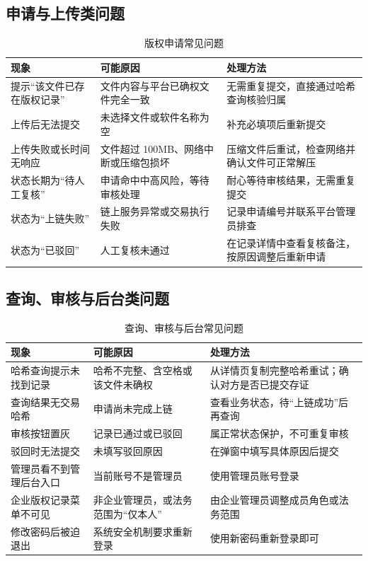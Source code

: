 \documentclass[UTF8,a4paper,12pt]{ctexart}
\begin{document}
\subsection{申请与上传类问题}
\begin{table}[H]
  \centering
  \caption{版权申请常见问题}
  \begin{tabularx}{0.96\textwidth}{p{} p{} Y}
    \toprule
    现象 & 可能原因 & 处理方法 \\
    \midrule
    提示“该文件已存在版权记录” & 文件内容与平台已确权文件完全一致 & 无需重复提交，直接通过哈希查询核验归属 \\
    上传后无法提交 & 未选择文件或软件名称为空 & 补充必填项后重新提交 \\
    上传失败或长时间无响应 & 文件超过 100MB、网络中断或压缩包损坏 & 压缩文件后重试，检查网络并确认文件可正常解压 \\
    状态长期为“待人工复核” & 申请命中中高风险，等待审核处理 & 耐心等待审核结果，无需重复提交 \\
    状态为“上链失败” & 链上服务异常或交易执行失败 & 记录申请编号并联系平台管理员排查 \\
    状态为“已驳回” & 人工复核未通过 & 在记录详情中查看复核备注，按原因调整后重新申请 \\
    \bottomrule
  \end{tabularx}
\end{table}

\subsection{查询、审核与后台类问题}
\begin{table}[H]
  \centering
  \caption{查询、审核与后台常见问题}
  \begin{tabularx}{0.96\textwidth}{p{} p{} Y}
    \toprule
    现象 & 可能原因 & 处理方法 \\
    \midrule
    哈希查询提示未找到记录 & 哈希不完整、含空格或该文件未确权 & 从详情页复制完整哈希重试；确认对方是否已提交存证 \\
    查询结果无交易哈希 & 申请尚未完成上链 & 查看业务状态，待“上链成功”后再查询 \\
    审核按钮置灰 & 记录已通过或已驳回 & 属正常状态保护，不可重复审核 \\
    驳回时无法提交 & 未填写驳回原因 & 在弹窗中填写具体原因后提交 \\
    管理员看不到管理后台入口 & 当前账号不是管理员 & 使用管理员账号登录 \\
    企业版权记录菜单不可见 & 非企业管理员，或法务范围为“仅本人” & 由企业管理员调整成员角色或法务范围 \\
    修改密码后被迫退出 & 系统安全机制要求重新登录 & 使用新密码重新登录即可 \\
    \bottomrule
  \end{tabularx}
\end{table}
\end{document}
